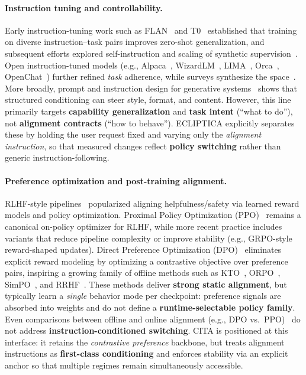 \paragraph{Instruction tuning and controllability.}
Early instruction-tuning work such as FLAN~\cite{wei2022finetuned,chung2022scaling,longpre2023flan} and T0~\cite{sanh2022multitask} established that training on diverse instruction--task pairs improves zero-shot generalization, and subsequent efforts explored self-instruction and scaling of synthetic supervision~\cite{wang2023self,iyer2022opt,mishra2022cross}. Open instruction-tuned models (e.g., Alpaca~\cite{taori2023alpaca}, WizardLM~\cite{xu2023wizardlm}, LIMA~\cite{zhou2023lima}, Orca~\cite{mukherjee2023orca}, OpenChat~\cite{wang2023openchat}) further refined \emph{task} adherence, while surveys synthesize the space~\cite{peng2023instruction}. More broadly, prompt and instruction design for generative systems~\cite{yang2023prompt} shows that structured conditioning can steer style, format, and content. However, this line primarily targets \textbf{capability generalization} and \textbf{task intent} (``what to do''), not \textbf{alignment contracts} (``how to behave''). ECLIPTICA explicitly separates these by holding the user request fixed and varying only the \emph{alignment instruction}, so that measured changes reflect \textbf{policy switching} rather than generic instruction-following.

\paragraph{Preference optimization and post-training alignment.}
RLHF-style pipelines~\cite{ouyang2022training} popularized aligning helpfulness/safety via learned reward models and policy optimization. Proximal Policy Optimization (PPO)~\cite{schulman2017proximal} remains a canonical on-policy optimizer for RLHF, while more recent practice includes variants that reduce pipeline complexity or improve stability (e.g., GRPO-style reward-shaped updates). Direct Preference Optimization (DPO)~\cite{rafailov2023direct} eliminates explicit reward modeling by optimizing a contrastive objective over preference pairs, inspiring a growing family of offline methods such as KTO~\cite{ethayarajh2024kto}, ORPO~\cite{hong2024orpo}, SimPO~\cite{meng2024simpo}, and RRHF~\cite{yuan2023rrhf}. These methods deliver \textbf{strong static alignment}, but typically learn a \emph{single} behavior mode per checkpoint: preference signals are absorbed into weights and do not define a \textbf{runtime-selectable policy family}. Even comparisons between offline and online alignment (e.g., DPO vs.\ PPO)~\cite{xu2024dpo} do not address \textbf{instruction-conditioned switching}. CITA is positioned at this interface: it retains the \emph{contrastive preference} backbone, but treats alignment instructions as \textbf{first-class conditioning} and enforces stability via an explicit anchor so that multiple regimes remain simultaneously accessible.

